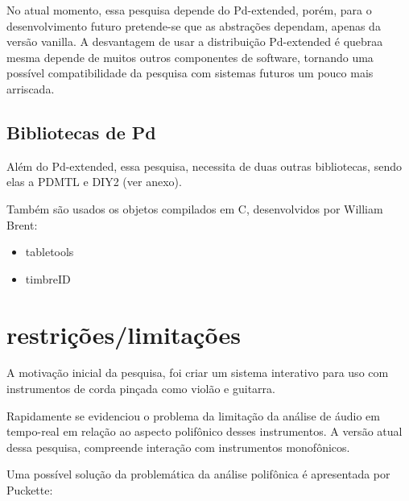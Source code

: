 \documentclass[draft]{ppgmus}
\begin{document}
No atual momento, essa pesquisa depende do Pd-extended, porém, para o desenvolvimento futuro pretende-se
que as abstrações dependam, apenas da versão vanilla. A desvantagem de usar a distribuição Pd-extended é quebraa mesma 
depende de muitos outros componentes de software, tornando uma possível compatibilidade da pesquisa com sistemas
futuros um pouco mais arriscada. 


\subsection{Bibliotecas de Pd}

Além do Pd-extended, essa pesquisa, necessita de duas outras bibliotecas, sendo elas a PDMTL e DIY2 (ver anexo).

Também são usados os objetos compilados em C, desenvolvidos por William Brent:

\begin{itemize}
 \item tabletools
 \item timbreID
\end{itemize}





\newpage


\section{restrições/limitações}


A motivação inicial da pesquisa, foi criar um sistema interativo
para uso com instrumentos de corda pinçada como violão e guitarra.

Rapidamente se evidenciou o problema da limitação da análise de áudio
em tempo-real em relação ao aspecto polifônico desses instrumentos.
A versão atual dessa pesquisa, compreende interação com instrumentos
monofônicos.

Uma possível solução da problemática da análise polifônica é apresentada
por Puckette:
\end{document}
